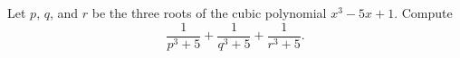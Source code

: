 Let $p$, $q$, and $r$ be the three roots of the cubic polynomial $x^3 - 5x + 1$. Compute \[\dfrac{1}{p^3 + 5} +\dfrac{1}{q^3 + 5}+\dfrac{1}{r^3 + 5}.\]
